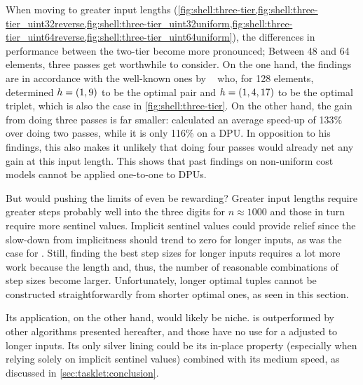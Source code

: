 When moving to greater input lengths (\cref{fig:shell:three-tier,fig:shell:three-tier_uint32reverse,fig:shell:three-tier_uint32uniform,fig:shell:three-tier_uint64reverse,fig:shell:three-tier_uint64uniform}), the differences in performance between the two-tier \ShS*{} become more pronounced;
Between 48 and 64 elements, three passes get worthwhile to consider.
On the one hand, the findings are in accordance with the well-known ones by \citeauthor{10.1007/3-540-44669-9_12}~\cites{10.1007/3-540-44669-9_12}[cf.][]{skean2023optimization} who, for 128 elements, determined \(h = \lparen1, 9\rparen\) to be the optimal pair and \(h = \lparen1, 4, 17\rparen\) to be the optimal triplet, which is also the case in \cref{fig:shell:three-tier}.
On the other hand, the gain from doing three passes is far smaller:
 calculated an average speed-up of 133\% over doing two passes, while it is only 116\% on a DPU.
In opposition to his findings, this also makes it unlikely that doing four passes would already net any gain at this input length.
This shows that past findings on non-uniform cost models cannot be applied one-to-one to DPUs.

But would pushing the limits of \ShS{} even be rewarding?
Greater input lengths require greater steps \Dash probably well into the three digits for \(n \approx 1000\) \cite{skean2023optimization,10.1007/3-540-44669-9_12} \Dash and those in turn require more sentinel values.
Implicit sentinel values could provide relief since the slow-down from implicitness should trend to zero for longer inputs, as was the case for \IS{}.
Still, finding the best step sizes for longer inputs requires a lot more work because the length and, thus, the number of reasonable combinations of step sizes become larger.
Unfortunately, longer optimal tuples cannot be constructed straightforwardly from shorter optimal ones, as seen in this section.

Its application, on the other hand, would likely be niche.
\ShS{} is outperformed by other algorithms presented hereafter, and those have no use for a \ShS{} adjusted to longer inputs.
Its only silver lining could be its in-place property (especially when relying solely on implicit sentinel values) combined with its medium speed, as discussed in \cref{sec:tasklet:conclusion}.
